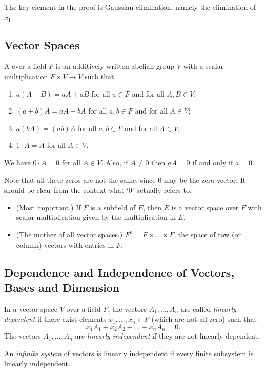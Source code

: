\begin{remark}
	The key element in the proof is Gaussian elimination, namely the elimination of $x_1$.
\end{remark}

\subsection{Vector Spaces}
\begin{definition}
	A  over a field $F$ is an additively written abelian group $V$ with a scalar multiplication $F \times V \to V$ such that
	\begin{enumerate}
		\item $a(A + B) = aA + aB$ \qquad for all $a \in F$ and for all $A, B \in V$;
		\item $(a + b)A = aA + bA$ \qquad for all $a, b \in F$ and for all $A \in V$;
		\item $a(bA) = (ab)A$ \qquad for all $a, b \in F$ and for all $A \in V$;
		\item $1 \cdot A = A$ \qquad for all $A \in V$.
	\end{enumerate}
\end{definition}

\begin{remark}
	We have $0 \cdot A = 0$ for all $A \in V$. Also, if $A \neq 0$ then $aA = 0$ if and only if $a = 0$.
	
	Note that all these zeros are not the same, since 0 may be the zero vector. It should be clear from the context what `0' actually refers to.
\end{remark}

\begin{examples}\hfill
	\begin{itemize}
		\item (Most important.) If $F$ is a subfield of $E$, then $E$ is a vector space over $F$ with scalar multiplication given by the multiplication in $E$.
		\item (The mother of all vector spaces.) $F^n = F \times \ldots \times F$, the space of row (or column) vectors with entries in $F$.
	\end{itemize}
\end{examples}

\subsection{Dependence and Independence of Vectors, Bases and Dimension}
\begin{definition}
	In a vector space $V$ over a field $F$, the vectors $A_1, \ldots, A_n$ are called \emph{linearly dependent} if there exist elements $x_1, \ldots, x_n \in F$ (which are not all zero) such that
	\[
		x_1 A_1 + x_2 A_2 + \ldots + x_n A_n = 0.
	\]
	The vectors $A_1, \ldots, A_n$ are \emph{linearly independent} if they are not linearly dependent.
	
	An \emph{infinite system} of vectors is linearly independent if every finite subsystem is linearly independent.
\end{definition}

